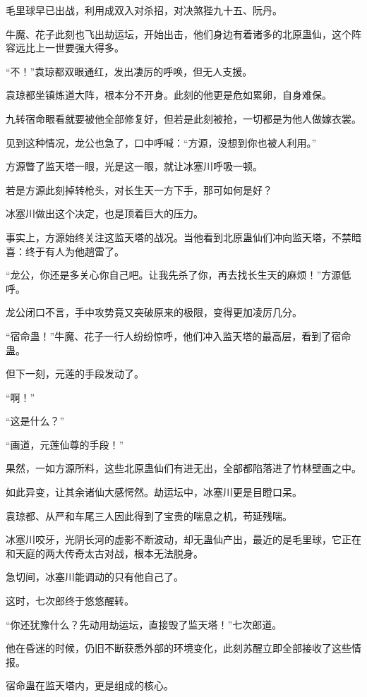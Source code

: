 \begin{this_body}
毛里球早已出战，利用成双入对杀招，对决煞狴九十五、阮丹。

牛魔、花子此刻也飞出劫运坛，开始出击，他们身边有着诸多的北原蛊仙，这个阵容远比上一世要强大得多。

“不！”袁琼都双眼通红，发出凄厉的呼唤，但无人支援。

袁琼都坐镇炼道大阵，根本分不开身。此刻的他更是危如累卵，自身难保。

九转宿命眼看就要被他全部修复好，但若是此刻被抢，一切都是为他人做嫁衣裳。

见到这种情况，龙公也急了，口中呼喊：“方源，没想到你也被人利用。”

方源瞥了监天塔一眼，光是这一眼，就让冰塞川呼吸一顿。

若是方源此刻掉转枪头，对长生天一方下手，那可如何是好？

冰塞川做出这个决定，也是顶着巨大的压力。

事实上，方源始终关注这监天塔的战况。当他看到北原蛊仙们冲向监天塔，不禁暗喜：终于有人为他趟雷了。

“龙公，你还是多关心你自己吧。让我先杀了你，再去找长生天的麻烦！”方源低呼。

龙公闭口不言，手中攻势竟又突破原来的极限，变得更加凌厉几分。

“宿命蛊！”牛魔、花子一行人纷纷惊呼，他们冲入监天塔的最高层，看到了宿命蛊。

但下一刻，元莲的手段发动了。

“啊！”

“这是什么？”

“画道，元莲仙尊的手段！”

果然，一如方源所料，这些北原蛊仙们有进无出，全部都陷落进了竹林壁画之中。

如此异变，让其余诸仙大感愕然。劫运坛中，冰塞川更是目瞪口呆。

袁琼都、从严和车尾三人因此得到了宝贵的喘息之机，苟延残喘。

冰塞川咬牙，光阴长河的虚影不断波动，却无蛊仙产出，最近的是毛里球，它正在和天庭的两大传奇太古对战，根本无法脱身。

急切间，冰塞川能调动的只有他自己了。

这时，七次郎终于悠悠醒转。

“你还犹豫什么？先动用劫运坛，直接毁了监天塔！”七次郎道。

他在昏迷的时候，仍旧不断获悉外部的环境变化，此刻苏醒立即全部接收了这些情报。

宿命蛊在监天塔内，更是组成的核心。


\end{this_body}
